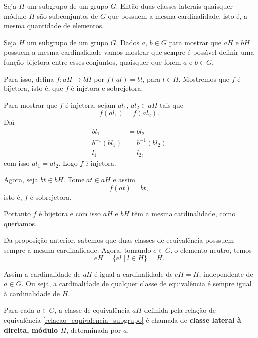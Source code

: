 \begin{proposicao}
    Seja $H$ um subgrupo de um grupo $G$. Ent\~ao duas classes laterais quaisquer m\'odulo $H$ s\~ao subconjuntos de $G$ que possuem a mesma cardinalidade, isto \'e, a mesma quantidade de elementos.
\end{proposicao}
\begin{prova}
    Seja $H$ um subgrupo de um grupo $G$. Dados $a$, $b \in G$ para mostrar que $aH$ e $bH$ possuem a mesma cardinalidade vamos mostrar que sempre \'e poss{\'\i}vel definir uma fun\c{c}\~ao bijetora entre esses conjuntos, quaisquer que forem $a$ e $b \in G$.

    Para isso, defina $f : aH \to bH$ por $f(al) = bl$, para $l \in H$. Mostremos que $f$ \'e bijetora, isto \'e, que $f$ \'e injetora e sobrejetora.

    Para mostrar que $f$ \'e injetora, sejam $al_1$, $al_2 \in aH$ tais que
    \[
        f(al_1) = f(al_2).
    \]
    Da{\'\i}
    \begin{align*}
        bl_1 &= bl_2\\
        b^{-1}(bl_1) &= b^{-1}(bl_2)\\
        l_1 &= l_2,
    \end{align*}
    com isso $al_1 = al_2$. Logo $f$ \'e injetora.

    Agora, seja $bt \in bH$. Tome $at \in aH$ e assim
    \[
        f(at) = bt,
    \]
    isto \'e, $f$ \'e sobrejetora.

    Portanto $f$ \'e bijetora e com isso $aH$ e $bH$ t\^em a mesma cardinalidade, como quer{\'\i}amos.
\end{prova}

\begin{observacao}
    Da proposi\c{c}\~ao anterior, sabemos que duas classes de equival\^encia posssuem sempre a mesma cardinalidade. Agora, tomando $e \in G$, o elemento neutro, temos
    \[
        eH = \{el \mid l \in H\} = H.
    \]

    Assim a cardinalidade de $aH$ \'e igual a cardinalidade de $eH = H$, independente de $a \in G$. Ou seja, a cardinalidade de qualquer classe de equival\^encia \'e sempre igual \`a cardinalidade de $H$.
\end{observacao}

\begin{definicao}
    Para cada $a \in G$, a classe de equival\^encia $aH$ definida pela rela\c{c}\~ao de equival\^encia \eqref{relacao_equivalencia_subgrupo} \'e chamada de \textbf{classe lateral \`a direita, m\'odulo $H$}, determinada por $a$.
\end{definicao}

